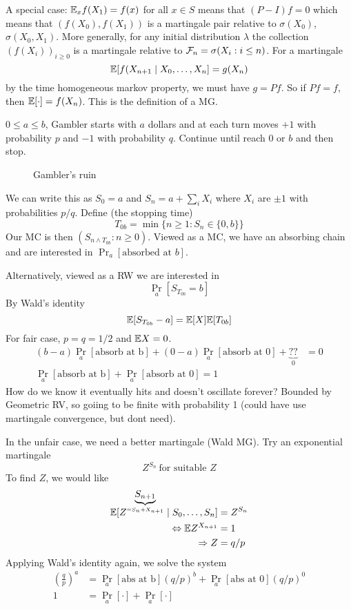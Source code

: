 A special case: $\mathbb{E}_x f(X_1) = f(x)$ for all
$x \in S$ means that $(P - I) f = 0$ which means
that $(f(X_0), f(X_1))$ is a martingale
pair relative to $\sigma(X_0)$, $\sigma(X_0, X_1)$.
More generally, for any initial distribution $\lambda$ the collection $(f(X_i))_{i \geq 0}$
is
a martingale relative to $\mathcal{F}_n = \sigma(X_i : i \leq n)$. For a martingale
\[
  \mathbb{E}[f(X_{n+1} \mid X_0, \ldots, X_n] = g(X_n)
\]
by the time homogeneous markov property, we must
have $g = P f$. So if $P f = f$, then
$\mathbb{E}[\cdot] = f(X_n)$. This is the definition
of a MG.

\begin{example}
  \label{eg:gamblers-ruin}

  $0 \leq a \leq b$, Gambler starts with $a$ dollars
  and at each turn moves $+1$ with probability $p$
  and $-1$ with probability $q$. Continue until
  reach $0$ or $b$ and then stop.

  \begin{figure}[H]
    \centering
    \caption{Gambler's ruin}
    \label{fig:gamblers-ruin}
  \end{figure}

  We can write this as $S_0 = a$ and $S_n = a + \sum_i X_i$ where $X_i$ are $\pm 1$ with probabilities
  $p/q$. Define (the stopping time)
  \[
    T_{0b} = \min\{n \geq 1 : S_n \in \{0,b\}\}
  \]
  Our MC is then $(S_{n \land T_{0b}} : n \geq 0)$.
  Viewed as a MC, we have an absorbing chain and are interested
  in $\Pr_a[\text{absorbed at $b$}]$.

  Alternatively, viewed as a RW we are interested in
  \[
    \Pr_a[S_{T_{0b}} = b]
  \]
  By Wald's identity
  \[
    \mathbb{E}[S_{T_{0b}} - a]
    = \mathbb{E}[X] \mathbb{E}[T_{0b}]
  \]
  For fair case, $p = q = 1/2$ and $\mathbb{E} X = 0$.
  \begin{align*}
    (b-a) \Pr_a[\text{absorb at b}] + (0 - a) \Pr_a[\text{absorb at 0}] + \underbrace{??}_{0} &= 0 \\
    \Pr_a[\text{absorb at b}] + \Pr_a[\text{absorb at 0}] = 1
  \end{align*}
  How do we know it eventually hits and doesn't oscillate forever?
  Bounded by Geometric RV, so goiing to be finite with probability 1
  (could have use martingale convergence, but dont need).

  In the unfair case, we need a better martingale (Wald MG). Try an
  exponential martingale
  \[
    Z^{S_n}~\text{for suitable $Z$}
  \]
  To find $Z$, we would like
  \begin{align*}
    \mathbb{E}[Z^{\underbrace{S_{n+1}}_{=S_n + X_{n+1}}} \mid S_0, \ldots, S_n] &= Z^{S_n} \\
    \Leftrightarrow \mathbb{E} Z^{X_{n+1}} &= 1 \\
    \Rightarrow Z &= q/p
  \end{align*}
  Applying Wald's identity again, we solve the system
  \begin{align*}
    \left(\frac{q}{p} \right)^a &= \Pr_a[\text{abs at b}] (q/p)^b + \Pr_a[\text{abs at 0}](q/p)^0 \\
    1 &= \Pr_a[\cdot] + \Pr_a[\cdot]
  \end{align*}
  \end{example}


